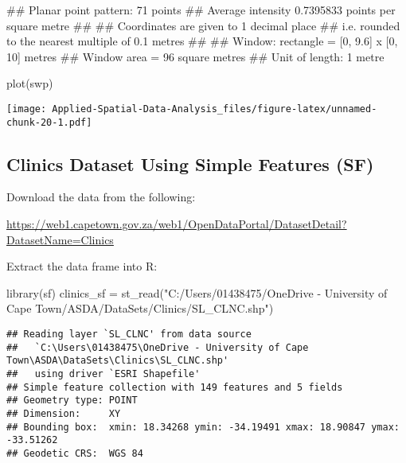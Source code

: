 \documentclass[
]{book}
\newenvironment{Shaded}{\begin{snugshade}}{\end{snugshade}}
\newcommand{\FunctionTok}[1]{\textcolor[rgb]{0.00,0.00,0.00}{#1}}
\newcommand{\NormalTok}[1]{#1}
\newcommand{\OtherTok}[1]{\textcolor[rgb]{0.56,0.35,0.01}{#1}}
\newcommand{\StringTok}[1]{\textcolor[rgb]{0.31,0.60,0.02}{#1}}
\begin{document}
\begin{Shaded}
\begin{Highlighting}[]
\NormalTok{\#\# Planar point pattern:  71 points}
\NormalTok{\#\# Average intensity 0.7395833 points per square metre}
\NormalTok{\#\# }
\NormalTok{\#\# Coordinates are given to 1 decimal place}
\NormalTok{\#\# i.e. rounded to the nearest multiple of 0.1 metres}
\NormalTok{\#\# }
\NormalTok{\#\# Window: rectangle = [0, 9.6] x [0, 10] metres}
\NormalTok{\#\# Window area = 96 square metres}
\NormalTok{\#\# Unit of length: 1 metre}
\end{Highlighting}
\end{Shaded}

\begin{Shaded}
\begin{Highlighting}[]
\FunctionTok{plot}\NormalTok{(swp)}
\end{Highlighting}
\end{Shaded}

\texttt{[image: Applied-Spatial-Data-Analysis\_files/figure-latex/unnamed-chunk-20-1.pdf]}

\hypertarget{clinics-dataset-using-simple-features-sf}{%
\subsection{Clinics Dataset Using Simple Features (SF)}\label{clinics-dataset-using-simple-features-sf}}

Download the data from the following:

\url{https://web1.capetown.gov.za/web1/OpenDataPortal/DatasetDetail?DatasetName=Clinics}

Extract the data frame into R:

\begin{Shaded}
\begin{Highlighting}[]
\FunctionTok{library}\NormalTok{(sf)}
\NormalTok{clinics\_sf }\OtherTok{=} \FunctionTok{st\_read}\NormalTok{(}\StringTok{"C:/Users/01438475/OneDrive {-} University of Cape Town/ASDA/DataSets/Clinics/SL\_CLNC.shp"}\NormalTok{)}
\end{Highlighting}
\end{Shaded}

\begin{verbatim}
## Reading layer `SL_CLNC' from data source 
##   `C:\Users\01438475\OneDrive - University of Cape Town\ASDA\DataSets\Clinics\SL_CLNC.shp' 
##   using driver `ESRI Shapefile'
## Simple feature collection with 149 features and 5 fields
## Geometry type: POINT
## Dimension:     XY
## Bounding box:  xmin: 18.34268 ymin: -34.19491 xmax: 18.90847 ymax: -33.51262
## Geodetic CRS:  WGS 84
\end{verbatim}
\end{document}
